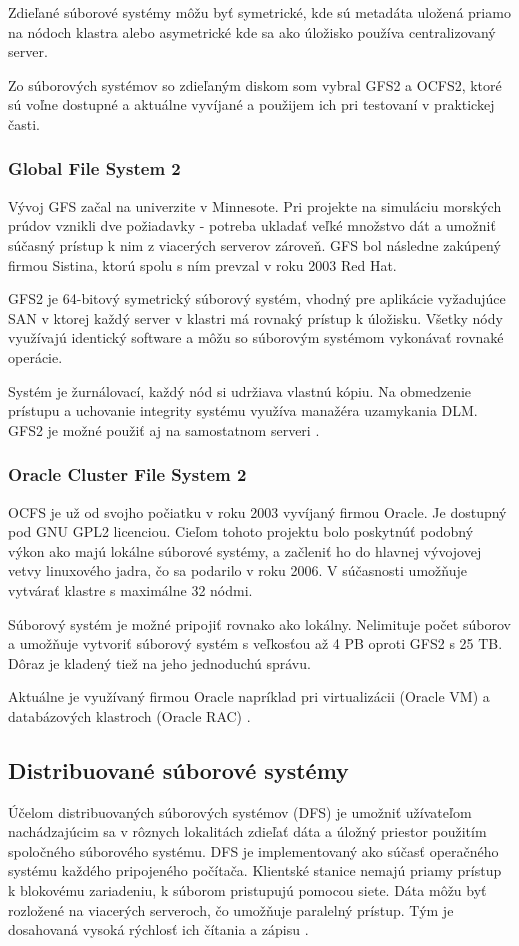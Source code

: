Zdieľané súborové systémy môžu byť symetrické, kde sú metadáta uložená priamo na nódoch klastra alebo asymetrické kde sa ako úložisko používa centralizovaný server.

Zo súborových systémov so zdieľaným diskom som vybral GFS2 a OCFS2, ktoré sú voľne dostupné a aktuálne vyvíjané a použijem ich pri testovaní v praktickej časti.

\subsubsection{Global File System 2}
Vývoj GFS začal na univerzite v Minnesote. Pri projekte na simuláciu morských prúdov vznikli dve požiadavky - potreba ukladať veľké množstvo dát a umožniť súčasný prístup k nim z viacerých serverov zároveň. GFS bol následne zakúpený firmou Sistina, ktorú spolu s ním prevzal v roku 2003 Red Hat.

GFS2 je 64-bitový symetrický súborový systém, vhodný pre aplikácie vyžadujúce SAN v ktorej každý server v klastri má rovnaký prístup k úložisku. Všetky nódy využívajú identický software a môžu so súborovým systémom vykonávať rovnaké operácie.

Systém je žurnálovací, každý nód si udržiava vlastnú kópiu. Na obmedzenie prístupu a uchovanie integrity systému využíva manažéra uzamykania DLM. GFS2 je možné použiť aj na samostatnom serveri \cite{pdf:gfs2}.

\subsubsection{Oracle Cluster File System 2}
OCFS je už od svojho počiatku v roku 2003 vyvíjaný firmou Oracle. Je dostupný pod GNU GPL2 licenciou. Cieľom tohoto projektu bolo poskytnúť podobný výkon ako majú lokálne súborové systémy, a začleniť ho do hlavnej vývojovej vetvy linuxového jadra, čo sa podarilo v roku 2006. V súčasnosti umožňuje vytvárať klastre s maximálne 32 nódmi.

Súborový systém je možné pripojiť rovnako ako lokálny. Nelimituje počet súborov a umožňuje vytvoriť súborový systém s veľkosťou až 4 PB oproti GFS2 s 25 TB. Dôraz je kladený tiež na jeho jednoduchú správu.

Aktuálne je využívaný firmou Oracle napríklad pri virtualizácii (Oracle VM) a databázových klastroch (Oracle RAC) \cite{pdf:ocfs2}.

\subsection{Distribuované súborové systémy}
Účelom distribuovaných súborových systémov (DFS) je umožniť užívateľom nachádzajúcim sa v rôznych lokalitách zdieľať dáta a úložný priestor použitím spoločného súborového systému. DFS je implementovaný ako súčasť operačného systému každého pripojeného počítača. Klientské stanice nemajú priamy prístup k blokovému zariadeniu, k súborom pristupujú pomocou siete. Dáta môžu byť rozložené na viacerých serveroch, čo umožňuje paralelný prístup. Tým je dosahovaná vysoká rýchlosť ich čítania a zápisu \cite{pdf:dfs}.

